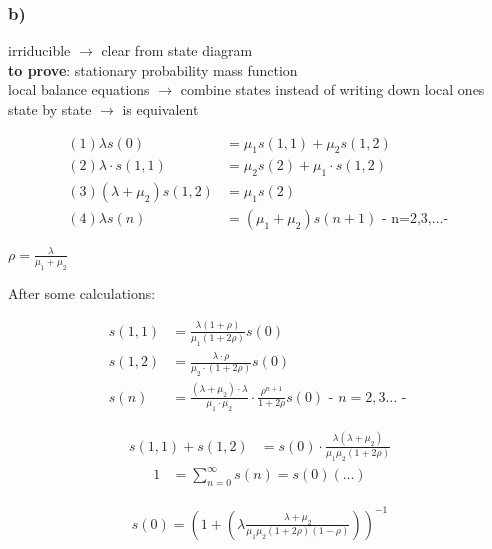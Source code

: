 \subsubsection*{ b) }

irriducible $\rightarrow$ clear from state diagram\\
\textbf{to prove}: stationary probability mass function\\
local balance equations $\rightarrow$ combine states instead of writing down local ones state by state $\rightarrow$ is equivalent

\begin{align*}
\left(1\right)\lambda s\left(0\right)&=\mu _{1}s\left(1,1\right)+\mu _{2}s\left(1,2\right)\\
\left(2\right)\lambda \cdot s\left(1,1\right)&=\mu _{2}s\left(2\right)+\mu _{1}\cdot s\left(1,2\right)\\
\left(3\right)\left(\lambda +\mu _{2}\right)s\left(1,2\right)&=\mu _{1}s\left(2\right)\\
\left(4\right)\lambda s\left(n\right)&=\left(\mu _{1}+\mu _{2}\right)s\left(n+1\right) \text{ - n=2,3,\ldots - }
\end{align*}

$\rho =\frac{\lambda }{\mu _{1}+\mu _{2}}$

After some calculations:

\begin{align*}
s\left(1,1\right)&=\frac{\lambda \left(1+\rho \right)}{\mu _{1}\left(1+2\rho \right)}s\left(0\right)\\
s\left(1,2\right)&=\frac{\lambda \cdot \rho }{\mu _{2}\cdot \left(1+2\rho \right)}s\left(0\right)\\
s\left(n\right)&=\frac{\left(\lambda +\mu _{2}\right)\cdot \lambda }{\mu _{1}\cdot \mu _{2}}\cdot \frac{\rho ^{{n+1}}}{1+2\rho }s\left(0\right)\text{ - $n=2,3\ldots$ - }
\end{align*}

\begin{align*}
s\left(1,1\right)+s\left(1,2\right)&=s\left(0\right)\cdot \frac{\lambda \left(\lambda +\mu _{2}\right)}{\mu _{1}\mu _{2}\left(1+2\rho \right)}
\end{align*}
\begin{align*}
1&=\sum _{{n=0}}^{\infty}s\left(n\right)=s\left(0\right)\left(\ldots\right)
\end{align*}

\begin{align*}
s\left(0\right)=\left(1+\left(\lambda \frac{\lambda +\mu _{2}}{\mu _{1}\mu _{2}\left(1+2\rho \right)\left(1-\rho \right)}\right)\right)^{{-1}}
\end{align*}

